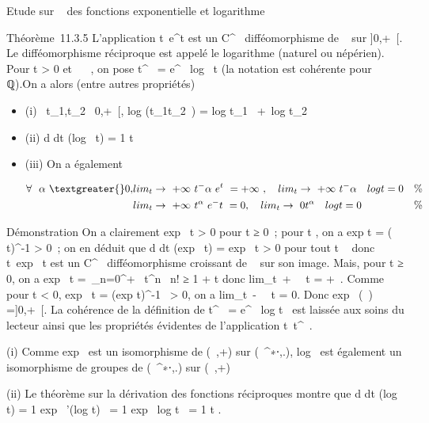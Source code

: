 \documentclass[]{article}
\begin{document}
Etude sur ~ des fonctions exponentielle et logarithme

Théorème~11.3.5 L'application
t\mapsto~e^t est un C^\infty~
difféomorphisme de ~ sur {]}0,+\infty~{[}. Le difféomorphisme réciproque est
appelé le logarithme (naturel ou népérien). Pour t \textgreater{} 0 et \alpha~
\in {}~, on pose t^\alpha~ = e^\alpha~ log~
t (la notation est cohérente pour \alpha~ \in ℚ).On a alors (entre autres
propriétés)

\begin{itemize}
\item
  (i) \forall~t_1,t_2~ \in{]}0,+\infty~{[},
  log (t_1t_2~)
  = log t_1~ +\
  log t_2
\item
  (ii)  d \over dt (log~ t)
  = 1 \over t
\item
  (iii) On a également

  \begin{align*} \forall~~\alpha~
  \textgreater{} 0, &
  lim_t\rightarrow~+\infty~t^-\alpha~e^t~
  = +\infty~,\quad
  lim_t\rightarrow~+\infty~t^-\alpha~~\
  log t = 0& \%& \\ &
  lim_t\rightarrow~+\infty~t^\alpha~e^-t~
  = 0,\quad
  lim_t\rightarrow~0t^\alpha~~\
  log t = 0 & \%& \\
  \end{align*}
\end{itemize}

Démonstration On a clairement exp~ t
\textgreater{} 0 pour t ≥ 0~; pour t , on a
exp t = (\exp~
t)^-1 \textgreater{} 0~; on en déduit que
 d \over dt (exp~ t)
= exp~ t \textgreater{} 0 pour tout t \in {}~ donc
t\mapsto~exp~ t est un
C^\infty~ difféomorphisme croissant de ~ sur son image. Mais, pour
t ≥ 0, on a exp~ t =\
\sum  _n=0^+\infty~ t^n~
\over n! ≥ 1 + t donc
lim_t\rightarrow~+\infty~\exp~
t = +\infty~. Comme pour t \textless{} 0, exp~ t =
(exp t)^-1~
\textgreater{} 0, on a
lim_t\rightarrow~-\infty~\exp~
t = 0. Donc exp~ (\mathbb{R}~) ={]}0,+\infty~{[}. La cohérence
de la définition de t^\alpha~ =
e^\alpha~ log t~ est laissée aux soins du
lecteur ainsi que les propriétés évidentes de l'application
t\mapsto~t^\alpha~.

(i) Comme exp~ est un isomorphisme de (~,+) sur
(~^∗⋅,.), log~ est également un
isomorphisme de groupes de (~^∗⋅,.) sur (\mathbb{R}~,+)

(ii) Le théorème sur la dérivation des fonctions réciproques montre que
 d \over dt (log~ t) = 1
\over exp~
'(log t)~ = 1 \over
exp \ log t~ = 1
\over t .
\end{document}
